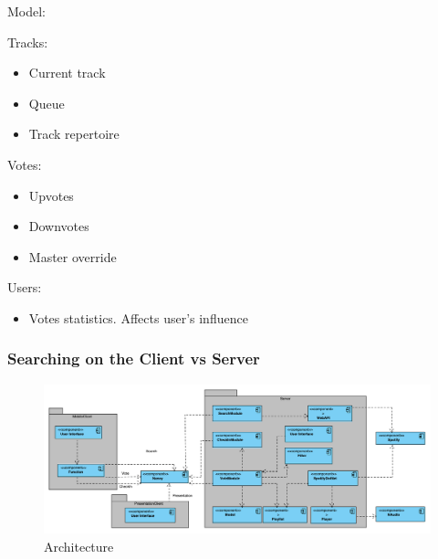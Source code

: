 \label{sec:architecture}


Model:

Tracks:
\begin{itemize}
  \item Current track
  \item Queue
  \item Track repertoire
\end{itemize}

Votes:
\begin{itemize}
  \item Upvotes
  \item Downvotes
  \item Master override
\end{itemize}

Users:
\begin{itemize}
  \item Votes statistics. Affects user's influence
\end{itemize}

\subsubsection{Searching on the Client vs Server}

\begin{figure}
  \centering
  \includegraphics[angle=90,width=0.6\linewidth]{Images/Arkitektur.pdf}
  \caption{Architecture}
  \label{fig:architecture}
\end{figure}
